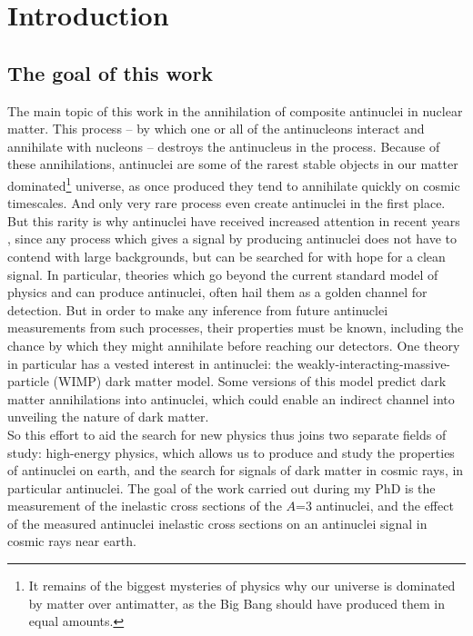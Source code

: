 \section{Introduction}

\subsection{The goal of this work}
The main topic of this work in the annihilation of composite antinuclei in nuclear matter. This process -- by which one or all of the antinucleons interact and annihilate with nucleons -- destroys the antinucleus in the process. Because of these annihilations, antinuclei are some of the rarest stable objects in our matter dominated\footnote{It remains of the biggest mysteries of physics why our universe is dominated by matter over antimatter, as the Big Bang should have produced them in equal amounts.} universe, as once produced they tend to annihilate quickly on cosmic timescales. And only very rare process even create antinuclei in the first place. \\
But this rarity is why antinuclei have received increased attention in recent years \cite{cookbook, Korsmeier:2017xzj, vonDoetinchem:2020vbj, Ibarra:2012cc}, since any process which gives a signal by producing antinuclei does not have to contend with large backgrounds, but can be searched for with hope for a clean signal. In particular, theories which go beyond the current standard model of physics and can produce antinuclei, often hail them as a golden channel for detection. But in order to make any inference from future antinuclei measurements from such processes, their properties must be known, including the chance by which they might annihilate before reaching our detectors. One theory in particular has a vested interest in antinuclei: the weakly-interacting-massive-particle (WIMP) dark matter model. Some versions of this model predict dark matter annihilations into antinuclei, which could enable an indirect channel into unveiling the nature of dark matter.\\

So this effort to aid the search for new physics thus joins two separate fields of study: high-energy physics, which allows us to produce and study the properties of antinuclei on earth, and the search for signals of dark matter in cosmic rays, in particular antinuclei. The goal of the work carried out during my PhD is the measurement of the inelastic cross sections of the $A$=3 antinuclei, and the effect of the measured antinuclei inelastic cross sections on an antinuclei signal in cosmic rays near earth. 

